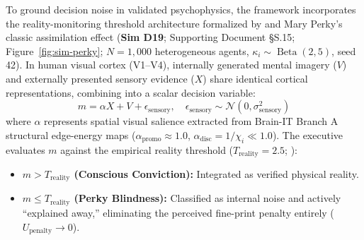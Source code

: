\documentclass[11pt,twocolumn]{article}
\theoremstyle{plain}
\begin{document}
To ground decision noise in validated psychophysics, the framework incorporates the reality-monitoring threshold architecture formalized by \citet{dijkstra2023} and Mary Perky's \citep{perky1910} classic assimilation effect (\textbf{Sim D19}; Supporting Document \S{}S.15; Figure~\ref{fig:sim-perky}; $N = 1{,}000$ heterogeneous agents, $\kappa_i \sim \operatorname{Beta}(2, 5)$, seed 42). In human visual cortex (V1--V4), internally generated mental imagery ($V$) and externally presented sensory evidence ($X$) share identical cortical representations, combining into a scalar decision variable:
\begin{equation}
m = \alpha X + V + \epsilon_{\text{sensory}}, \quad \epsilon_{\text{sensory}} \sim \mathcal{N}(0, \sigma_{\text{sensory}}^2)
\end{equation}
where $\alpha$ represents spatial visual salience extracted from Brain-IT Branch A structural edge-energy maps ($\alpha_{\text{promo}} \approx 1.0$, $\alpha_{\text{disc}} = 1/\chi_i \ll 1.0$). The executive evaluates $m$ against the empirical reality threshold ($T_{\text{reality}} = 2.5$; \citealp{dijkstra2023}):
\begin{itemize}
\item \textbf{$m > T_{\text{reality}}$ (Conscious Conviction):} Integrated as verified physical reality.
\item \textbf{$m \le T_{\text{reality}}$ (Perky Blindness):} Classified as internal noise and actively ``explained away,'' eliminating the perceived fine-print penalty entirely ($U_{\text{penalty}} \to 0$).
\end{itemize}
\end{document}
